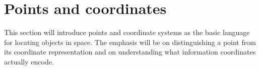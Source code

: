 \section{Points and coordinates}

This section will introduce points and coordinate systems as the basic language for locating objects in space. The emphasis will be on distinguishing a point from its coordinate representation and on understanding what information coordinates actually encode.
